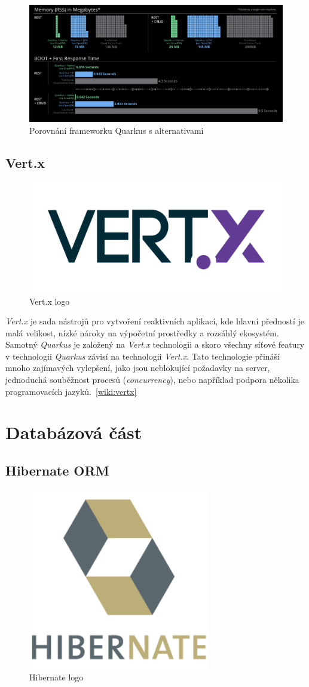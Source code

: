 \begin{figure}[hbt]
  \centering
  \includegraphics[width=1 \linewidth]{obrazky-figures/quarkus_stats.png}
  \caption{Porovnání frameworku Quarkus s alternativami}
  \label{figure:quarkus_stats}
\end{figure}

\newpage
\subsection*{Vert.x}
\label{pouzite:vertx}
\begin{figure}[hbt]
  \centering
  \includegraphics[width=.30 \linewidth]{obrazky-figures/vertx.png}
  \caption{Vert.x logo}
\end{figure}

\emph{Vert.x} je sada nástrojů pro vytvoření reaktivních aplikací, kde hlavní předností je malá velikost, nízké nároky na výpočetní prostředky a rozsáhlý ekosystém.
Samotný \emph{Quarkus} je založený na \emph{Vert.x} technologii a skoro všechny síťové featury v technologii \emph{Quarkus} závisí na technologii \emph{Vert.x}.
Tato technologie přináší mnoho zajímavých vylepšení, jako jsou neblokující požadavky na server, jednoduchá souběžnost procesů (\emph{concurrency}), nebo například podpora několika programovacích jazyků.~\ref{wiki:vertx}

\section{Databázová část}
\label{pouzite:db}

\subsection*{Hibernate ORM}
\label{app_prostredi:hibernate}
\begin{figure}[hbt]
  \centering
  \includegraphics[width=.2 \linewidth]{obrazky-figures/hibernate.png}
  \caption{Hibernate logo}
\end{figure}

